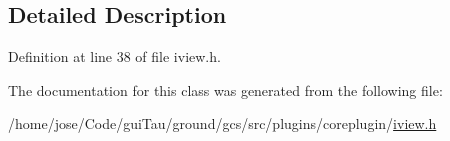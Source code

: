 \subsection{Detailed Description}


Definition at line 38 of file iview.\-h.



The documentation for this class was generated from the following file\-:\begin{DoxyCompactItemize}
\item 
/home/jose/\-Code/gui\-Tau/ground/gcs/src/plugins/coreplugin/\hyperlink{iview_8h}{iview.\-h}\end{DoxyCompactItemize}

